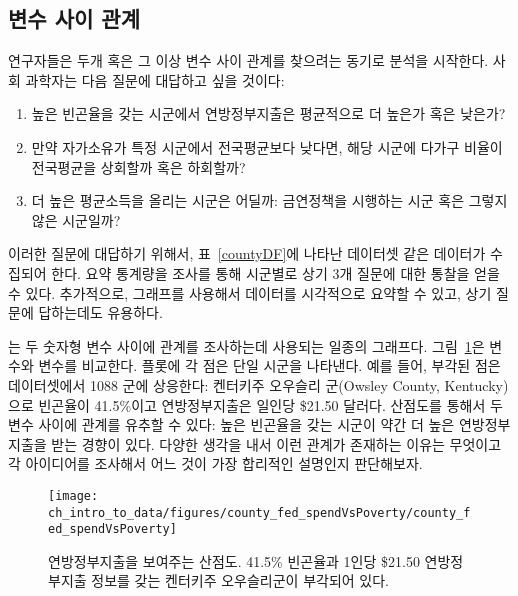 \subsection{변수 사이 관계}
\label{variableRelations}

연구자들은 두개 혹은 그 이상 변수 사이 관계를 찾으려는 동기로 분석을 시작한다.
사회 과학자는 다음 질문에 대답하고 싶을 것이다:

\begin{enumerate}
\setlength{\itemsep}{0mm}
\item[(1)]\label{fedSpendingPovertyQuestion} 
높은 빈곤율을 갖는 시군에서 연방정부지출은 평균적으로 더 높은가 혹은 낮은가?
\item[(2)]\label{ownershipMultiUnitQuestion} 
만약 자가소유가 특정 시군에서 전국평균보다 낮다면,
해당 시군에 다가구 비율이 전국평균을 상회할까 혹은 하회할까?
\item[(3)]\label{isAverageIncomeAssociatedWithSmokingBans} 
더 높은 평균소득을 올리는 시군은 어딜까: 금연정책을 시행하는 시군 혹은 그렇지 않은 시군일까?
\end{enumerate}

이러한 질문에 대답하기 위해서, 표~\ref{countyDF}에 나타난  데이터셋 같은 데이터가 수집되어 한다.
요약 통계량을 조사를 통해 시군별로 상기 3개 질문에 대한 통찰을 얻을 수 있다.
추가적으로, 그래프를 사용해서 데이터를 시각적으로 요약할 수 있고, 상기 질문에 답하는데도 유용하다.

는 두 숫자형 변수 사이에 관계를 조사하는데 사용되는 일종의 그래프다.
그림~\ref{county_fed_spendVsPoverty}은  변수와  변수를 비교한다.
플롯에 각 점은 단일 시군을 나타낸다.
예를 들어, 부각된 점은  데이터셋에서 1088 군에 상응한다: 켄터키주 오우슬리 군(Owsley County, Kentucky)으로 빈곤율이 41.5\%이고 연방정부지출은 일인당 \$21.50 달러다.
산점도를 통해서 두 변수 사이에 관계를 유추할 수 있다: 높은 빈곤율을 갖는 시군이 약간 더 높은 연방정부지출을 받는 경향이 있다. 다양한 생각을 내서 이런 관계가 존재하는 이유는 무엇이고 각 아이디어를 조사해서 어느 것이 가장 합리적인 설명인지 판단해보자.

\begin{figure}
\centering
\texttt{[image: ch\_intro\_to\_data/figures/county\_fed\_spendVsPoverty/county\_fed\_spendVsPoverty]}
\caption{ 연방정부지출을 보여주는 산점도.
41.5\% 빈곤율과 1인당 \$21.50 연방정부지출 정보를 갖는 켄터키주 오우슬리군이 부각되어 있다.}
\label{county_fed_spendVsPoverty}
\end{figure}

